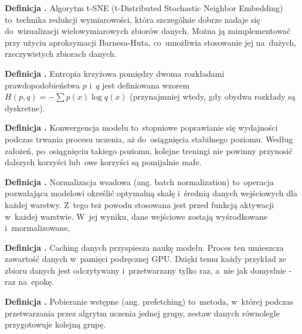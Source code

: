 \noindent
\textbf{Definicja .}
\incrementdefinitionIndex
Algorytm t-SNE (t-Distributed Stochastic Neighbor Embedding) to~technika redukcji wymiarowości,
która szczególnie dobrze nadaje się do~wizualizacji wielowymiarowych zbiorów danych.
Można ją zaimplementować przy użyciu aproksymacji Barnesa-Huta,
co~umożliwia stosowanie jej na~dużych, rzeczywistych zbiorach danych.

\noindent
\textbf{Definicja .}
\incrementdefinitionIndex
Entropia krzyżowa pomiędzy dwoma rozkładami prawdopodobieństwa $p$ i~$q$ jest definiowana wzorem
$H(p,q) = -\sum p(x) \log q(x) $ (przynajmniej wtedy, gdy obydwa rozkłady są dyskretne).

\noindent
\textbf{Definicja .}
\incrementdefinitionIndex
Konwergencja modelu to~stopniowe poprawianie się wydajności podczas trwania procesu uczenia,
aż do~osiągnięcia stabilnego poziomu. Według założeń, po~osiągnięciu takiego poziomu,
kolejne treningi nie powinny przynosić dalszych korzyści lub~owe korzyści są pomijalnie małe.

\noindent
\textbf{Definicja .}
\incrementdefinitionIndex
Normalizacja wsadowa (ang. batch normalization) to~operacja pozwalająca modelowi określić optymalną skalę
i~średnią danych wejściowych dla każdej warstwy.
Z~tego też powodu stosowana jest przed funkcją aktywacji w~każdej warstwie.
W~jej wyniku, dane wejściowe zostają wyśrodkowane i~znormalizowane,

\noindent
\textbf{Definicja .}
\incrementdefinitionIndex
Caching danych przyspiesza naukę modelu. Proces ten umieszcza zawartość danych w~pamięci podręcznej GPU.
Dzięki temu każdy przykład ze zbioru danych jest odczytywany i~przetwarzany tylko raz, a~nie jak domyslnie - raz na~epokę.

\noindent
\textbf{Definicja .}
\incrementdefinitionIndex
Pobieranie wstępne (ang. prefetching) to~metoda, w~której podczas przetwarzania przez algrytm uczenia jednej grupy,
zestaw danych równolegle przygotowuje kolejną grupę.